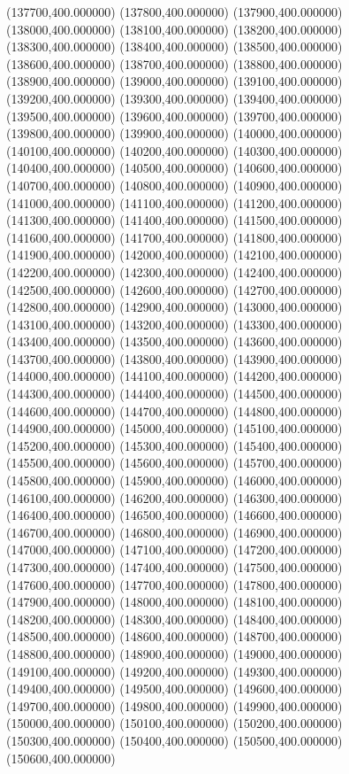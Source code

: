 (137700,400.000000)
(137800,400.000000)
(137900,400.000000)
(138000,400.000000)
(138100,400.000000)
(138200,400.000000)
(138300,400.000000)
(138400,400.000000)
(138500,400.000000)
(138600,400.000000)
(138700,400.000000)
(138800,400.000000)
(138900,400.000000)
(139000,400.000000)
(139100,400.000000)
(139200,400.000000)
(139300,400.000000)
(139400,400.000000)
(139500,400.000000)
(139600,400.000000)
(139700,400.000000)
(139800,400.000000)
(139900,400.000000)
(140000,400.000000)
(140100,400.000000)
(140200,400.000000)
(140300,400.000000)
(140400,400.000000)
(140500,400.000000)
(140600,400.000000)
(140700,400.000000)
(140800,400.000000)
(140900,400.000000)
(141000,400.000000)
(141100,400.000000)
(141200,400.000000)
(141300,400.000000)
(141400,400.000000)
(141500,400.000000)
(141600,400.000000)
(141700,400.000000)
(141800,400.000000)
(141900,400.000000)
(142000,400.000000)
(142100,400.000000)
(142200,400.000000)
(142300,400.000000)
(142400,400.000000)
(142500,400.000000)
(142600,400.000000)
(142700,400.000000)
(142800,400.000000)
(142900,400.000000)
(143000,400.000000)
(143100,400.000000)
(143200,400.000000)
(143300,400.000000)
(143400,400.000000)
(143500,400.000000)
(143600,400.000000)
(143700,400.000000)
(143800,400.000000)
(143900,400.000000)
(144000,400.000000)
(144100,400.000000)
(144200,400.000000)
(144300,400.000000)
(144400,400.000000)
(144500,400.000000)
(144600,400.000000)
(144700,400.000000)
(144800,400.000000)
(144900,400.000000)
(145000,400.000000)
(145100,400.000000)
(145200,400.000000)
(145300,400.000000)
(145400,400.000000)
(145500,400.000000)
(145600,400.000000)
(145700,400.000000)
(145800,400.000000)
(145900,400.000000)
(146000,400.000000)
(146100,400.000000)
(146200,400.000000)
(146300,400.000000)
(146400,400.000000)
(146500,400.000000)
(146600,400.000000)
(146700,400.000000)
(146800,400.000000)
(146900,400.000000)
(147000,400.000000)
(147100,400.000000)
(147200,400.000000)
(147300,400.000000)
(147400,400.000000)
(147500,400.000000)
(147600,400.000000)
(147700,400.000000)
(147800,400.000000)
(147900,400.000000)
(148000,400.000000)
(148100,400.000000)
(148200,400.000000)
(148300,400.000000)
(148400,400.000000)
(148500,400.000000)
(148600,400.000000)
(148700,400.000000)
(148800,400.000000)
(148900,400.000000)
(149000,400.000000)
(149100,400.000000)
(149200,400.000000)
(149300,400.000000)
(149400,400.000000)
(149500,400.000000)
(149600,400.000000)
(149700,400.000000)
(149800,400.000000)
(149900,400.000000)
(150000,400.000000)
(150100,400.000000)
(150200,400.000000)
(150300,400.000000)
(150400,400.000000)
(150500,400.000000)
(150600,400.000000)
